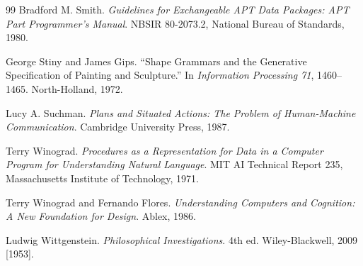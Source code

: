\documentclass[11pt]{article}
\begin{document}
\begin{thebibliography}{99}
Bradford M. Smith. \emph{Guidelines for Exchangeable APT Data Packages: APT Part Programmer's Manual}. NBSIR 80-2073.2, National Bureau of Standards, 1980.

George Stiny and James Gips. ``Shape Grammars and the Generative Specification of Painting and Sculpture.'' In \emph{Information Processing 71}, 1460--1465. North-Holland, 1972.

Lucy A. Suchman. \emph{Plans and Situated Actions: The Problem of Human-Machine Communication}. Cambridge University Press, 1987.

Terry Winograd. \emph{Procedures as a Representation for Data in a Computer Program for Understanding Natural Language}. MIT AI Technical Report 235, Massachusetts Institute of Technology, 1971.

Terry Winograd and Fernando Flores. \emph{Understanding Computers and Cognition: A New Foundation for Design}. Ablex, 1986.

Ludwig Wittgenstein. \emph{Philosophical Investigations}. 4th ed. Wiley-Blackwell, 2009 [1953].

\end{thebibliography}
\end{document}
